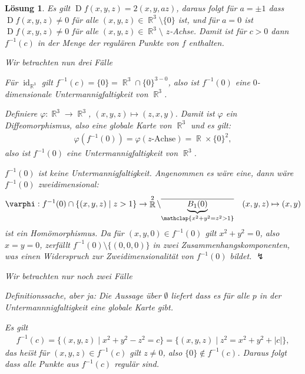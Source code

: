 \documentclass[paper=A4, twoside, chapterprefix=true, bibliography=totoc, headsepline]{scrbook}
\let\temp\phi{}
\let\phi\varphi{}
\let\varphi\temp{}
\let\temp\theta{}
\let\theta\vartheta{}
\let\vartheta\temp{}
\let\temp\epsilon{}
\let\epsilon\varepsilon{}
\let\varepsilon\temp{}
\let\temp\rho{}
\let\rho\varrho{}
\let\varrho\temp{}
\DeclareMathOperator{\R}{\mathbb{R}}
\DeclareMathOperator{\id}{id}       %
\DeclareMathOperator{\D}{D}         %
\newcommand{\X}{\times}
\theoremstyle{plain}
\theoremstyle{nonumberplain}
\theoremstyle{empty}
\theoremstyle{break}
\newtheorem{Loes}{L\"osung}
\begin{document}
\begin{Loes}
Es gilt $\D f (x, y, z) = 2(x, y, az)$, daraus folgt f\"ur $a = \pm 1 $ dass $\D f(x, y, z) \ne 0$ f\"ur alle $(x, y, z) \in \R^3 \setminus \{0\}$ ist, und f\"ur $a = 0$ ist $\D f(x, y, z) \ne 0$ f\"ur alle $(x, y, z) \in \R^3 \setminus$ $z$-Achse.
Damit ist f\"ur $c > 0$ dann $f^{-1}(c)$ in der Menge der regul\"aren Punkte von $f$ enthalten.
\begin{description}[leftmargin=*]
\item[F\"ur $\bm{c = 0}$:]
	Wir betrachten nun drei F\"alle
	\begin{description}[font=\normalfont]
	\item[$a = 1$:]
		F\"ur $\id_{\R^3}$ gilt $f^{-1}(c) = \{0\} = \R^3 \cap \{0\}^{3-0}$, also ist $f^{-1}(0)$ eine $0$-dimensionale Untermannigfaltigkeit von $\R^3$.
	\item[$a = 0$:]
		Definiere $\phi: \R^3 \to \R^3$, $(x, y, z) \mapsto (z, x, y)$.
		Damit ist $\phi$ ein Diffeomorphismus, also eine globale Karte von $\R^3$ und es gilt:
		\begin{align*}
			\phi(f^{-1}(0)) = \phi(z \text{-Achse}) = \R \X \{0\}^2,
		\end{align*}
		also ist $f^{-1}(0)$ eine Untermannigfaltigkeit von $\R^3$.
	\item[$a = -1$:]
		$f^{-1}(0)$ ist keine Untermannigfaltigkeit. Angenommen es w\"are eine, dann w\"are $f^{-1}(0)$ zweidimensional:
		\begin{align*}
			\phi: f^{-1}(0) \cap \{(x, y, z) \mid z > 1 \} \to \R^2 \setminus \overline{\underbrace{B_1(0)}_{\mathclap{x^2 + y^2 = z^2 > 1}}} &&
			(x, y, z) \mapsto (x, y)
		\end{align*}
		ist ein Hom\"omorphismus.
		Da f\"ur $(x, y, 0) \in f^{-1}(0)$ gilt $x^2 + y^2 = 0$, also $x = y = 0$, zerf\"allt $f^{-1}(0) \setminus \{(0,0,0)\}$ in zwei Zusammenhangskomponenten, was einen Widerspruch zur Zweidimensionalit\"at von $f^{-1}(0)$ bildet. $\lightning$
	\end{description}
\item[F\"ur $\bm{c < 0}$:]
	Wir betrachten nur noch zwei F\"alle
	\begin{description}[font=\normalfont]
	\item[$a = 1, 0$:]
		Definitionssache, aber ja: Die Aussage \"uber $\emptyset$ liefert dass es f\"ur alle $p$ in der Untermannnigfaltigkeit eine globale Karte gibt.
	\item[$a = -1$:]
		Es gilt
		\begin{align*}
			f^{-1}(c) = \{ (x,y,z) \mid x^2 + y^2 - z^2 = c \} = \{ (x,y,z) \mid z^2 = x^2 + y^2 + |c| \},
		\end{align*}
		das hei\"st f\"ur $(x, y, z) \in f^{-1}(c)$ gilt $z \ne 0$, also $\{0\} \notin f^{-1}(c)$.
		Daraus folgt dass alle Punkte aus $f^{-1}(c)$ regul\"ar sind.
	\end{description}
\end{description}
\end{Loes}
\end{document}
